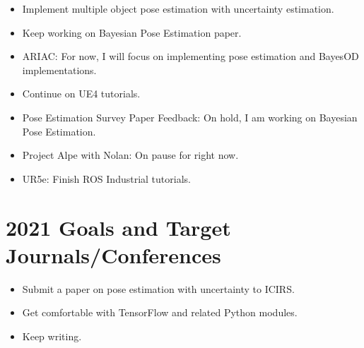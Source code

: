 \documentclass[11pt]{article}
\begin{document}
\begin{itemize}

	\item Implement multiple object pose estimation with uncertainty estimation.
	\item Keep working on Bayesian Pose Estimation paper.
	\item ARIAC: For now, I will focus on implementing pose estimation and
	      BayesOD implementations.

	\item Continue on UE4 tutorials.

	\item Pose Estimation Survey Paper Feedback: On hold, I am working on
	      Bayesian Pose Estimation.
	\item Project Alpe with Nolan: On pause for right now.
	\item UR5e: Finish ROS Industrial tutorials.
\end{itemize}

\section{2021 Goals and Target Journals/Conferences}
\begin{itemize}
	\item Submit a paper on pose estimation with uncertainty to ICIRS.
	\item Get comfortable with TensorFlow and related Python modules.
	\item Keep writing.
\end{itemize}


\newpage


\end{document}
